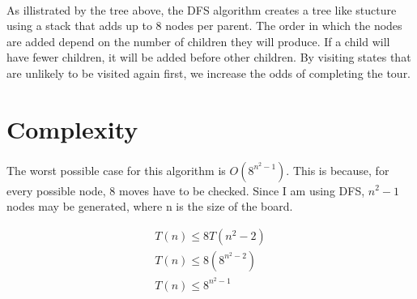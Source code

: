 \documentclass{article}
\begin{document}
\paragraph{}
As illistrated by the tree above, the DFS algorithm creates a tree like stucture using a stack that adds up to 8 nodes per parent. The order in which the nodes are added depend on the number of children they will produce. If a child will have fewer children, it will be added before other children. By visiting states that are unlikely to be visited again first, we increase the odds of completing the tour.

\newpage

\section{Complexity}

\paragraph{}
The worst possible case for this algorithm is $O(8^{n^2-1})$. This is because, for every possible node, 8 moves have to be checked. Since I am using DFS, $n^2-1$ nodes may be generated, where n is the size of the board.

\begin{gather*}
T(n) \leq 8T(n^2 - 2) \\
T(n) \leq 8(8^{n^2-2}) \\
T(n) \leq 8^{n^2-1} \\
\end{gather*}
\end{document}
